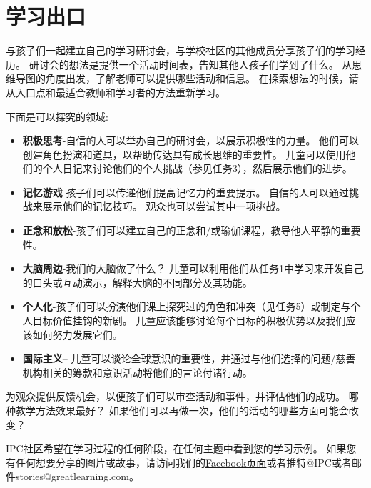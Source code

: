 \chapter{学习出口}
    与孩子们一起建立自己的学习研讨会，与学校社区的其他成员分享孩子们的学习经历。 研讨会的想法是提供一个活动时间表，告知其他人孩子们学到了什么。 从思维导图的角度出发，了解老师可以提供哪些活动和信息。 在探索想法的时候，请从入口点和最适合教师和学习者的方法重新学习。 \par
    下面是可以探究的领域:\par

    \begin{itemize}
      \item \textbf{积极思考}-自信的人可以举办自己的研讨会，以展示积极性的力量。 他们可以创建角色扮演和道具，以帮助传达具有成长思维的重要性。 儿童可以使用他们的个人日记来讨论他们的个人挑战（参见任务3），然后展示他们的进步。
      \item  \textbf{记忆游戏}-孩子们可以传递他们提高记忆力的重要提示。 自信的人可以通过挑战来展示他们的记忆技巧。 观众也可以尝试其中一项挑战。
      \item  \textbf{正念和放松}-孩子们可以建立自己的正念和/或瑜伽课程，教导他人平静的重要性。
      \item  \textbf{大脑周边}-我们的大脑做了什么？ 儿童可以利用他们从任务1中学习来开发自己的口头或互动演示，解释大脑的不同部分及其功能。
      \item  \textbf{个人化}-孩子们可以扮演他们课上探究过的角色和冲突（见任务5）或制定与个人目标价值挂钩的新剧。 儿童应该能够讨论每个目标的积极优势以及我们应该如何努力发展它们。
      \item  \textbf{国际主义}-- 儿童可以谈论全球意识的重要性，并通过与他们选择的问题/慈善机构相关的筹款和意识活动将他们的言论付诸行动。  
    \end{itemize}  

    为观众提供反馈机会，以便孩子们可以审查活动和事件，并评估他们的成功。 哪种教学方法效果最好？ 如果他们可以再做一次，他们的活动的哪些方面可能会改变？\par
    IPC社区希望在学习过程的任何阶段，在任何主题中看到您的学习示例。 如果您有任何想要分享的图片或故事，请访问我们的\href{http://www.facebook.com/InternationalPrimaryCurriculum}{Facebook页面}或者推特@IPC或者邮件stories@greatlearning.com。

